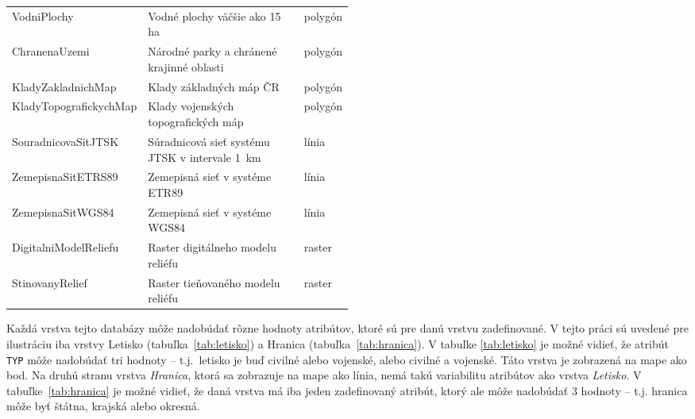 \begin{table}[H]
\begin{tabular}{|l|p{0.5\linewidth}|l|}
    VodniPlochy            & Vodné plochy väčšie ako 15 ha                  & polygón            \\
    ChranenaUzemi          & Národné parky a chránené krajinné oblasti      & polygón            \\
    KladyZakladnichMap     & Klady základných máp ČR                        & polygón            \\
    KladyTopografickychMap & Klady vojenských topografických máp            & polygón            \\
    SouradnicovaSitJTSK    & Súradnicová sieť systému JTSK v intervale 1~km & línia              \\
    ZemepisnaSitETRS89     & Zemepisná sieť v systéme ETR89                 & línia              \\
    ZemepisnaSitWGS84      & Zemepisná sieť v systéme WGS84                 & línia              \\
    DigitalniModelReliefu  & Raster digitálneho modelu reliéfu              & raster             \\
    StinovanyRelief        & Raster tieňovaného modelu reliéfu              & raster             \\ \hline
\end{tabular}
\end{table}

Každá vrstva tejto databázy môže nadobúdať rôzne hodnoty atribútov, ktoré sú pre danú vrstvu zadefinované. V tejto práci sú uvedené pre ilustráciu iba vrstvy Letisko (tabuľka~\ref{tab:letisko}) a Hranica (tabuľka~\ref{tab:hranica}). V tabuľke \ref{tab:letisko} je možné vidieť, že atribút \texttt{TYP} môže nadobúdať tri hodnoty \--- t.j.~letisko je buď civilné alebo vojenské, alebo civilné a vojenské. Táto vrstva je zobrazená na mape ako bod. Na druhú stranu vrstva \emph{Hranica}, ktorá sa zobrazuje na mape ako línia, nemá takú variabilitu atribútov ako vrstva \emph{Letisko}. V tabuľke~\ref{tab:hranica} je možné vidieť, že daná vrstva má iba jeden zadefinovaný atribút, ktorý ale môže nadobúdať 3 hodnoty \--- t.j. hranica môže byť štátna, krajská alebo okresná.

